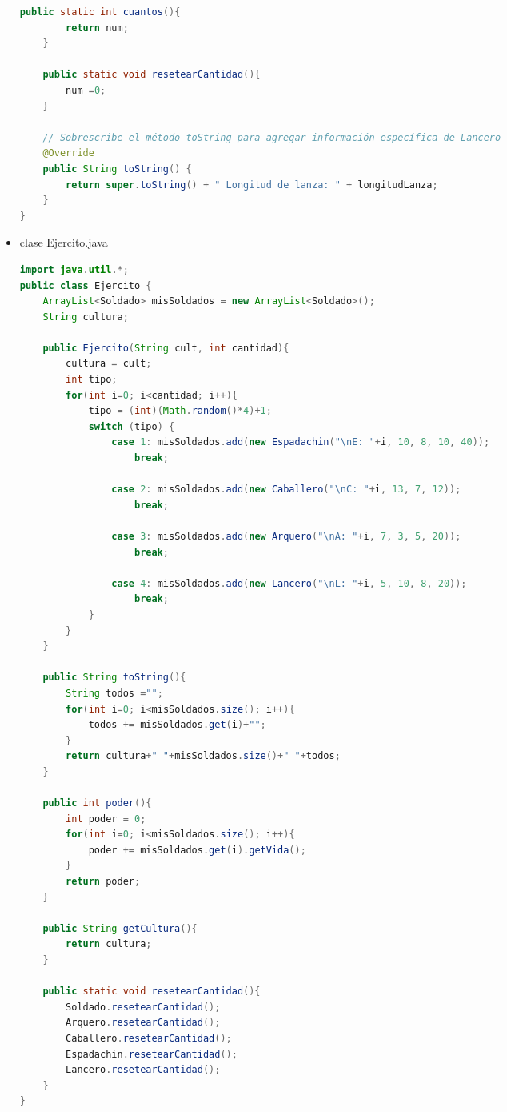 \documentclass{article}
\begin{document}
\begin{itemize}
\begin{lstlisting}[language=java]
    public static int cuantos(){
        return num;
    }

    public static void resetearCantidad(){
        num =0;
    }

    // Sobrescribe el método toString para agregar información específica de Lancero
    @Override
    public String toString() {
        return super.toString() + " Longitud de lanza: " + longitudLanza;
    }
}
        \end{lstlisting}

        \item clase Ejercito.java
        \begin{lstlisting}[language=java]
import java.util.*;
public class Ejercito {
    ArrayList<Soldado> misSoldados = new ArrayList<Soldado>();
    String cultura;

    public Ejercito(String cult, int cantidad){
        cultura = cult;
        int tipo;
        for(int i=0; i<cantidad; i++){
            tipo = (int)(Math.random()*4)+1;
            switch (tipo) {
                case 1: misSoldados.add(new Espadachin("\nE: "+i, 10, 8, 10, 40));
                    break;
            
                case 2: misSoldados.add(new Caballero("\nC: "+i, 13, 7, 12));
                    break;

                case 3: misSoldados.add(new Arquero("\nA: "+i, 7, 3, 5, 20));
                    break;

                case 4: misSoldados.add(new Lancero("\nL: "+i, 5, 10, 8, 20));
                    break;
            }
        }
    }

    public String toString(){
        String todos ="";
        for(int i=0; i<misSoldados.size(); i++){
            todos += misSoldados.get(i)+"";
        }
        return cultura+" "+misSoldados.size()+" "+todos;
    }

    public int poder(){
        int poder = 0;
        for(int i=0; i<misSoldados.size(); i++){
            poder += misSoldados.get(i).getVida();
        }
        return poder;
    }

    public String getCultura(){
        return cultura;
    }

    public static void resetearCantidad(){
        Soldado.resetearCantidad();
        Arquero.resetearCantidad();
        Caballero.resetearCantidad();
        Espadachin.resetearCantidad();
        Lancero.resetearCantidad();
    }
}
        \end{lstlisting}


\end{itemize}
\end{document}

